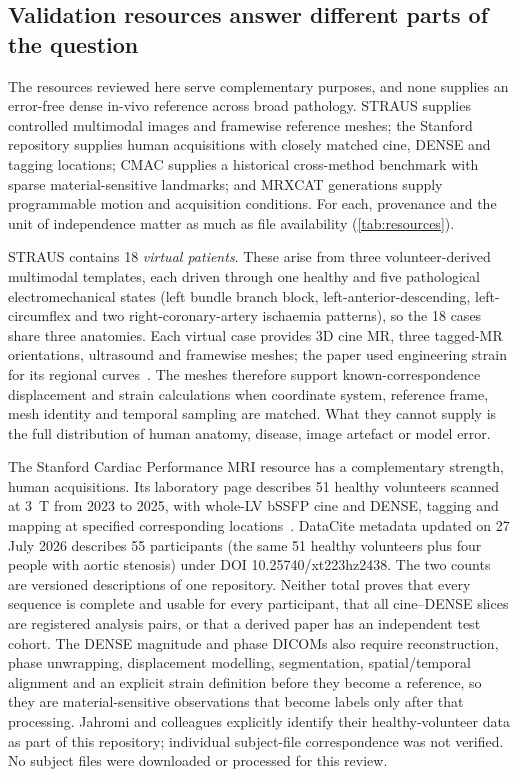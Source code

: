 \subsection{Validation resources answer different parts of the question}\label{sec:resources}

The resources reviewed here serve complementary purposes, and none supplies an error-free dense in-vivo reference across broad pathology. STRAUS supplies controlled multimodal images and framewise reference meshes; the Stanford repository supplies human acquisitions with closely matched cine, DENSE and tagging locations; CMAC supplies a historical cross-method benchmark with sparse material-sensitive landmarks; and MRXCAT generations supply programmable motion and acquisition conditions. For each, provenance and the unit of independence matter as much as file availability (\cref{tab:resources}).

STRAUS contains 18 \emph{virtual patients}. These arise from three volunteer-derived multimodal templates, each driven through one healthy and five pathological electromechanical states (left bundle branch block, left-anterior-descending, left-circumflex and two right-coronary-artery ischaemia patterns), so the 18 cases share three anatomies. Each virtual case provides 3D cine MR, three tagged-MR orientations, ultrasound and framewise meshes; the paper used engineering strain for its regional curves~\cite{zhou2018straus,strausdata}. The meshes therefore support known-correspondence displacement and strain calculations when coordinate system, reference frame, mesh identity and temporal sampling are matched. What they cannot supply is the full distribution of human anatomy, disease, image artefact or model error.

The Stanford Cardiac Performance MRI resource has a complementary strength, human acquisitions. Its laboratory page describes 51 healthy volunteers scanned at 3~T from 2023 to 2025, with whole-LV bSSFP cine and DENSE, tagging and mapping at specified corresponding locations~\cite{stanforddata}. DataCite metadata updated on 27 July 2026 describes 55 participants (the same 51 healthy volunteers plus four people with aortic stenosis) under DOI 10.25740/xt223hz2438. The two counts are versioned descriptions of one repository. Neither total proves that every sequence is complete and usable for every participant, that all cine--DENSE slices are registered analysis pairs, or that a derived paper has an independent test cohort. The DENSE magnitude and phase DICOMs also require reconstruction, phase unwrapping, displacement modelling, segmentation, spatial/temporal alignment and an explicit strain definition before they become a reference, so they are material-sensitive observations that become labels only after that processing. Jahromi and colleagues explicitly identify their healthy-volunteer data as part of this repository; individual subject-file correspondence was not verified. No subject files were downloaded or processed for this review.

